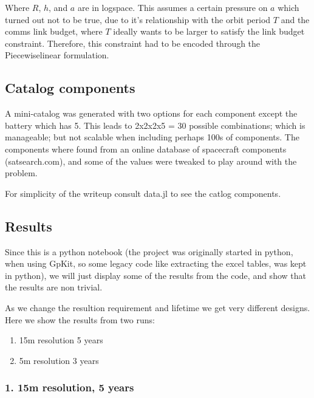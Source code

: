 \documentclass[11pt]{article}
\providecommand{\tightlist}{%
      \setlength{\itemsep}{0pt}\setlength{\parskip}{0pt}}
\begin{document}
Where \(R\), \(h\), and \(a\) are in logspace. This assumes a certain
pressure on \(a\) which turned out not to be true, due to it's
relationship with the orbit period \(T\) and the comms link budget,
where \(T\) ideally wants to be larger to satisfy the link budget
constraint. Therefore, this constraint had to be encoded through the
Piecewiselinear formulation.

    \hypertarget{catalog-components}{%
\subsection{Catalog components}\label{catalog-components}}

A mini-catalog was generated with two options for each component except
the battery which has 5. This leads to 2x2x2x5 = 30 possible
combinations; which is manageable; but not scalable when including
perhaps 100s of components. The components where found from an online
database of spacecraft components (satsearch.com), and some of the
values were tweaked to play around with the problem.

For simplicity of the writeup consult data.jl to see the catlog
components.

    \hypertarget{results}{%
\subsection{Results}\label{results}}

    Since this is a python notebook (the project was originally started in
python, when using GpKit, so some legacy code like extracting the excel
tables, was kept in python), we will just display some of the results
from the code, and show that the results are non trivial.

    As we change the resultion requirement and lifetime we get very
different designs. Here we show the results from two runs:

\begin{enumerate}
\def\labelenumi{\arabic{enumi}.}
\tightlist
\item
  15m resolution 5 years
\item
  5m resolution 3 years
\end{enumerate}

    \hypertarget{m-resolution-5-years}{%
\subsubsection{1. 15m resolution, 5 years}\label{m-resolution-5-years}}
\end{document}
